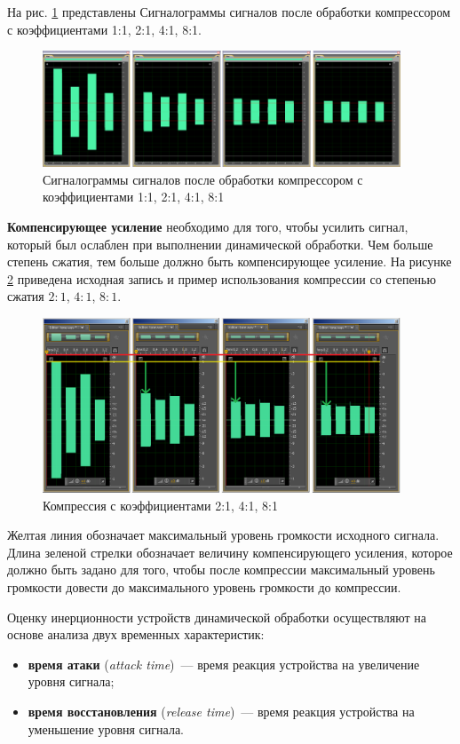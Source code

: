\documentclass[oneside, final, 14pt]{extreport}
\begin{document}
На рис. \ref{pic-compress-07} представлены Сигналограммы сигналов после обработки компрессором с коэффициентами 1:1, 2:1, 4:1, 8:1.

\begin{figure}[h!]
  \centering
  \includegraphics[width=0.95\textwidth]{pic-compress-07}
  \caption{Сигналограммы сигналов после обработки компрессором с коэффициентами 1:1, 2:1, 4:1, 8:1}
  \label{pic-compress-07}
\end{figure}

\textbf{Компенсирующее усиление} необходимо для того, чтобы усилить сигнал, который был ослаблен при выполнении динамической обработки. Чем больше степень сжатия, тем больше должно быть компенсирующее усиление. На рисунке \ref{pic-compress-03} приведена исходная запись и пример использования компрессии со степенью сжатия $2:1$, $4:1$, $8:1$.

\begin{figure}[h!]
  \centering
  \includegraphics[width=0.95\textwidth]{pic-compress-03}
  \caption{Компрессия с коэффициентами 2:1, 4:1, 8:1}
  \label{pic-compress-03}
\end{figure}

Желтая линия обозначает максимальный уровень громкости исходного сигнала. Длина зеленой стрелки обозначает величину компенсирующего усиления, которое должно быть задано для того, чтобы после компрессии максимальный уровень громкости довести до максимального уровень громкости до компрессии.

Оценку инерционности устройств динамической обработки осуществляют на основе анализа двух временных характеристик: 
\begin{itemize}
  \item \textbf{время атаки} (\emph{attack time})~--- время реакция устройства на увеличение уровня сигнала;
  \item \textbf{время восстановления }(\emph{release time})~--- время реакция устройства на уменьшение уровня сигнала.
\end{itemize}
\end{document}
